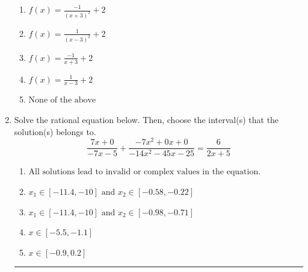 \documentclass[14pt]{extbook}
\newcommand{\litem}[1]{\item#1\hspace*{-1cm}\rule{\textwidth}{0.4pt}}
\begin{document}
\begin{enumerate}
{\begin{center}
\end{center}
\begin{enumerate}[label=\Alph*.]
\item \( f(x) = \frac{-1}{(x + 3)^2} + 2 \)
\item \( f(x) = \frac{1}{(x - 3)^2} + 2 \)
\item \( f(x) = \frac{-1}{x + 3} + 2 \)
\item \( f(x) = \frac{1}{x - 3} + 2 \)
\item \( \text{None of the above} \)

\end{enumerate} }
\litem{
Solve the rational equation below. Then, choose the interval(s) that the solution(s) belongs to.\[ \frac{7x + 0}{-7x -5} + \frac{-7x^{2} +0 x + 0}{-14x^{2} -45 x -25} = \frac{6}{2x + 5} \]\begin{enumerate}[label=\Alph*.]
\item \( \text{All solutions lead to invalid or complex values in the equation.} \)
\item \( x_1 \in [-11.4, -10] \text{ and } x_2 \in [-0.58,-0.22] \)
\item \( x_1 \in [-11.4, -10] \text{ and } x_2 \in [-0.98,-0.71] \)
\item \( x \in [-5.5,-1.1] \)
\item \( x \in [-0.9,0.2] \)

\end{enumerate} }
\end{enumerate}
\end{document}
